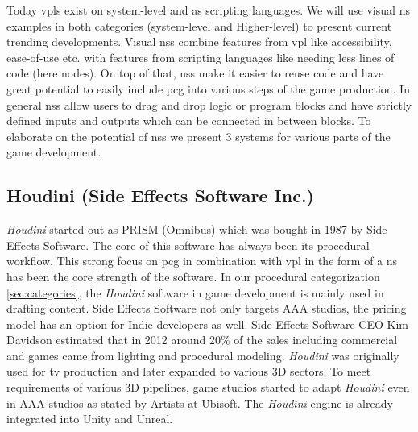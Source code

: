 \documentclass[10pt,a4paper]{article}
\begin{document}
\begin{multicols}{2}
Today \gls{vpl}s exist on system-level and as scripting languages. We will use visual \gls{ns} examples in both categories (system-level and Higher-level) to present current trending developments. Visual \gls{ns}s combine features from \gls{vpl} like accessibility, ease-of-use etc. with features from scripting languages like needing less lines of code (here nodes). On top of that, \gls{ns}s make it easier to reuse code and have great potential to easily include \gls{pcg} into various steps of the game production. In general \gls{ns}s allow users to drag and drop logic or program blocks and have strictly defined inputs and outputs which can be connected in between blocks. To elaborate on the potential of \gls{ns}s we present 3 systems for various parts of the game development.\end{multicols}
\subsection{Houdini (Side Effects Software Inc.)}
\begin{multicols}{2}
\textit{Houdini} started out as PRISM (Omnibus) which was bought in 1987 by Side Effects Software. The core of this software has always been its procedural workflow. This strong focus on \gls{pcg} in combination with \gls{vpl} in the form of a \gls{ns} has been the core strength of the software\cite{Seymour2012}. In our procedural categorization \autoref{sec:categories}, the \textit{Houdini} software in game development is mainly used in drafting content. Side Effects Software not only targets AAA studios, the pricing model has an option for Indie developers as well. Side Effects Software CEO Kim Davidson estimated that in 2012 around 20\% of the sales including commercial and games came from lighting and procedural modeling. \textit{Houdini} was originally used for tv production and later expanded to various 3D sectors. To meet requirements of various 3D pipelines, game studios started to adapt \textit{Houdini} even in AAA studios as stated by Artists at Ubisoft\cite{Carrier2018}. The \textit{Houdini} engine is already integrated into Unity and Unreal\cite{SideFXGamesupport}.\end{multicols}
\end{document}
